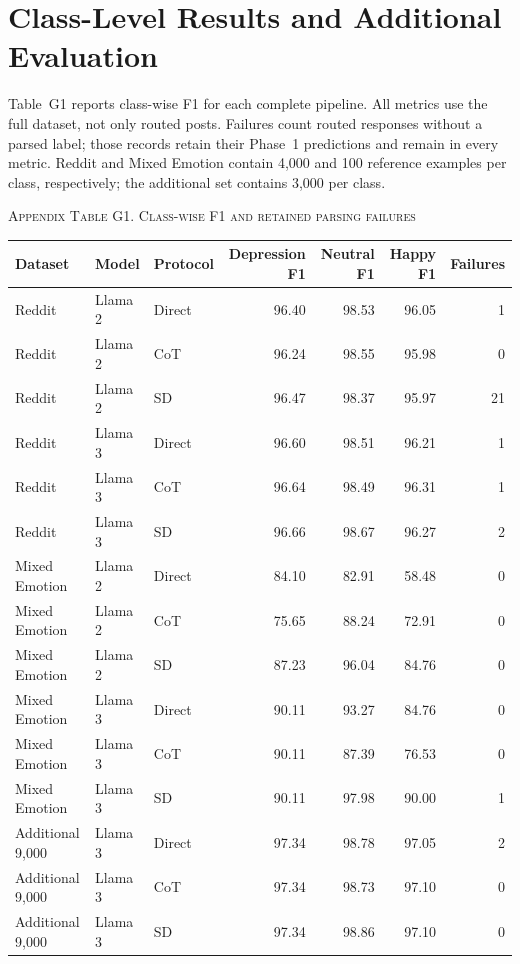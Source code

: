 \documentclass{ieeeaccess}
\begin{document}
\section{Class-Level Results and Additional Evaluation}\label{app:additional}
Table~G1 reports class-wise F1 for each complete pipeline. All metrics use the full dataset, not only routed posts. Failures count routed responses without a parsed label; those records retain their Phase~1 predictions and remain in every metric. Reddit and Mixed Emotion contain 4,000 and 100 reference examples per class, respectively; the additional set contains 3,000 per class.
\par\medskip\noindent\textsc{Appendix Table G1. Class-wise F1 and retained parsing failures}\par\smallskip
{\small\renewcommand{\arraystretch}{1.15}\noindent\begin{tabular*}{\textwidth}{@{\extracolsep{\fill}}lllrrrr@{}}\toprule
Dataset & Model & Protocol & Depression F1 & Neutral F1 & Happy F1 & Failures \\\midrule
Reddit & Llama 2 & Direct & 96.40 & 98.53 & 96.05 & 1 \\
Reddit & Llama 2 & CoT & 96.24 & 98.55 & 95.98 & 0 \\
Reddit & Llama 2 & SD & 96.47 & 98.37 & 95.97 & 21 \\
Reddit & Llama 3 & Direct & 96.60 & 98.51 & 96.21 & 1 \\
Reddit & Llama 3 & CoT & 96.64 & 98.49 & 96.31 & 1 \\
Reddit & Llama 3 & SD & 96.66 & 98.67 & 96.27 & 2 \\
Mixed Emotion & Llama 2 & Direct & 84.10 & 82.91 & 58.48 & 0 \\
Mixed Emotion & Llama 2 & CoT & 75.65 & 88.24 & 72.91 & 0 \\
Mixed Emotion & Llama 2 & SD & 87.23 & 96.04 & 84.76 & 0 \\
Mixed Emotion & Llama 3 & Direct & 90.11 & 93.27 & 84.76 & 0 \\
Mixed Emotion & Llama 3 & CoT & 90.11 & 87.39 & 76.53 & 0 \\
Mixed Emotion & Llama 3 & SD & 90.11 & 97.98 & 90.00 & 1 \\
Additional 9,000 & Llama 3 & Direct & 97.34 & 98.78 & 97.05 & 2 \\
Additional 9,000 & Llama 3 & CoT & 97.34 & 98.73 & 97.10 & 0 \\
Additional 9,000 & Llama 3 & SD & 97.34 & 98.86 & 97.10 & 0 \\
\bottomrule\end{tabular*}}\par\medskip
\end{document}
